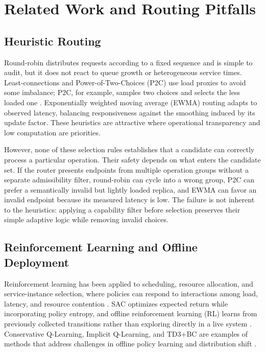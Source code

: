 \documentclass[conference]{IEEEtran}
\begin{document}
\section{Related Work and Routing Pitfalls}
\subsection{Heuristic Routing}
Round-robin distributes requests according to a fixed sequence and is simple to audit, but it does not react to queue growth or heterogeneous service times. Least-connections and Power-of-Two-Choices (P2C) use load proxies to avoid some imbalance; P2C, for example, samples two choices and selects the less loaded one \cite{mitzenmacher2001}. Exponentially weighted moving average (EWMA) routing adapts to observed latency, balancing responsiveness against the smoothing induced by its update factor. These heuristics are attractive where operational transparency and low computation are priorities.

However, none of these selection rules establishes that a candidate can correctly process a particular operation. Their safety depends on what enters the candidate set. If the router presents endpoints from multiple operation groups without a separate admissibility filter, round-robin can cycle into a wrong group, P2C can prefer a semantically invalid but lightly loaded replica, and EWMA can favor an invalid endpoint because its measured latency is low. The failure is not inherent to the heuristics: applying a capability filter before selection preserves their simple adaptive logic while removing invalid choices.

\subsection{Reinforcement Learning and Offline Deployment}
Reinforcement learning has been applied to scheduling, resource allocation, and service-instance selection, where policies can respond to interactions among load, latency, and resource contention \cite{wu2023,boudieb2024}. SAC optimizes expected return while incorporating policy entropy, and offline reinforcement learning (RL) learns from previously collected transitions rather than exploring directly in a live system \cite{haarnoja2018,levine2020,prudencio2024}. Conservative Q-Learning, Implicit Q-Learning, and TD3+BC are examples of methods that address challenges in offline policy learning and distribution shift \cite{kumar2020,kostrikov2022,fujimoto2021}.
\end{document}
